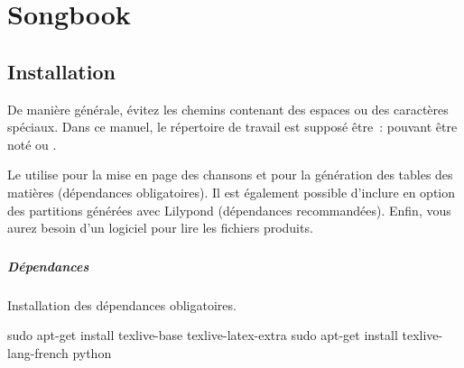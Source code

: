 \chapter{Songbook}
\setcounter{chapter}{1}
\label{chap:songbook}
\minitoc
{}


\section{Installation}
\label{sec:install}

De manière générale, évitez les chemins contenant des espaces ou des
caractères spéciaux. Dans ce manuel, le répertoire de travail est
supposé être~:  pouvant être noté
 ou .

Le \songbook utilise \latex pour la mise en page des chansons et
\python pour la génération des tables des matières (dépendances
obligatoires). Il est également possible d'inclure en option des
partitions générées avec Lilypond (dépendances recommandées). Enfin,
vous aurez besoin d'un logiciel pour lire les fichiers 
produits.

\subsection{\linux}

\paragraph{Dépendances}

Installation des dépendances obligatoires.
\begin{unix}
  sudo apt-get install texlive-base texlive-latex-extra
  sudo apt-get install texlive-lang-french python
\end{unix}

